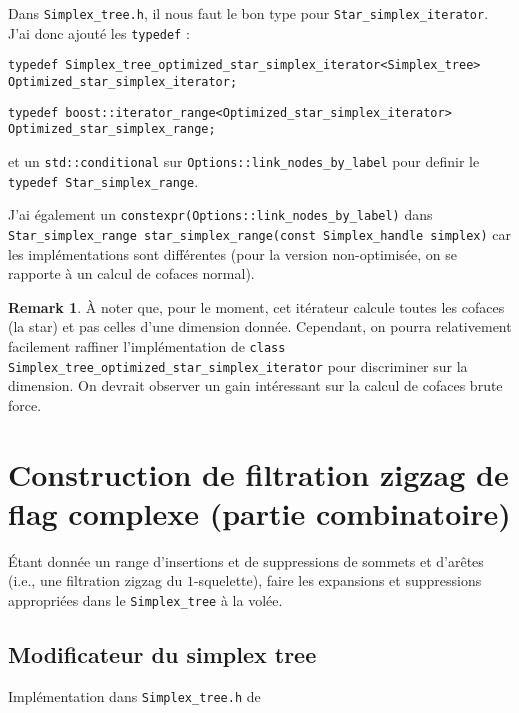 \documentclass[11pt]{amsart}
\numberwithin{equation}{section}
\theoremstyle{plain}
\theoremstyle{definition}
\newtheorem{remark}[equation]{Remark}
\begin{document}
Dans {\tt Simplex\_tree.h}, il nous faut le bon type pour {\tt Star\_simplex\_iterator}. J'ai donc ajouté les {\tt typedef} :

\medskip

  {\tt typedef Simplex\_tree\_optimized\_star\_simplex\_iterator<Simplex\_tree> 
                                                    Optimized\_star\_simplex\_iterator;}

\medskip

  {\tt typedef boost::iterator\_range<Optimized\_star\_simplex\_iterator> 
                                                       Optimized\_star\_simplex\_range;}

\medskip

et un {\tt std::conditional} sur {\tt Options::link\_nodes\_by\_label} pour definir le {\tt typedef Star\_simplex\_range}.

J'ai également un {\tt constexpr(Options::link\_nodes\_by\_label)} dans 
{\tt Star\_simplex\_range star\_simplex\_range(const Simplex\_handle simplex)} 
car les implémentations sont différentes (pour la version non-optimisée, on se rapporte à un calcul de cofaces normal).


\begin{remark}
À noter que, pour le moment, cet itérateur calcule toutes les cofaces (la star) et pas celles d'une dimension donnée. Cependant, on pourra relativement facilement raffiner l'implémentation de {\tt class Simplex\_tree\_optimized\_star\_simplex\_iterator} pour discriminer sur la dimension. On devrait observer un gain intéressant sur la calcul de cofaces brute force.
\end{remark}




\section{Construction de filtration zigzag de flag complexe (partie combinatoire)}

Étant donnée un range d'insertions et de suppressions de sommets et d'arêtes (i.e., une filtration zigzag du $1$-squelette), faire les expansions et suppressions appropriées dans le {\tt Simplex\_tree} à la volée.

\subsection{Modificateur du simplex tree}

Implémentation dans {\tt Simplex\_tree.h} de
\end{document}
